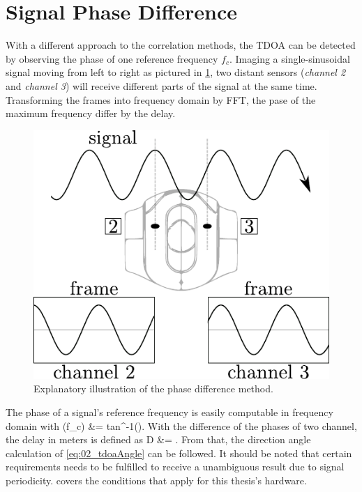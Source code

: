\section{Signal Phase Difference}
\label{sec:02_phase}

With a different approach to the correlation methods, the \ac{TDOA} can be
detected by observing the phase of one reference frequency $f_c$.
Imaging a single-sinusoidal signal moving from left to right as
pictured in \cref{fig:02_phaseTheory}, two distant sensors
(\textit{channel 2} and \textit{channel 3}) will
receive different parts of the signal at the same time.
Transforming the frames into frequency domain by \ac{FFT}, the pase of the
maximum frequency differ by the delay.

\begin{figure}[ht]
	\centering
		\includegraphics[width=0.35\columnwidth]{figures/phase_theory}
	\caption{Explanatory illustration of the phase difference method.}
    \label{fig:02_phaseTheory}
\end{figure}

The phase of a signal's reference frequency is easily computable in frequency domain
with
\bal
    \phi(f_c) &= tan^{-1}\left(\right).
\eal
With the difference of the phases of two channel, the delay in meters is defined as
\bal
    D &= .
\eal
From that, the direction angle calculation of \cref{eq:02_tdoaAngle} can
be followed.
It should be noted that certain requirements needs to be fulfilled to receive a
unambiguous result due to signal periodicity.
 covers the conditions that apply for this thesis's
hardware.
